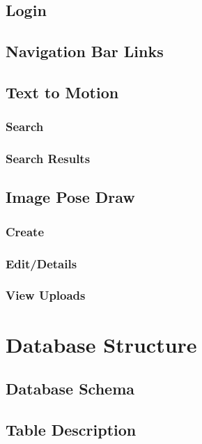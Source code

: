 \documentclass{scrreprt}
\begin{document}
\section{Login}

\section{Navigation Bar Links}

\section{Text to Motion}

\subsection{Search}

\subsection{Search Results}

\section{Image Pose Draw}

\subsection{Create}

\subsection{Edit/Details}

\subsection{View Uploads}





\chapter{Database Structure}

\section{Database Schema}
\section{Table Description}
\end{document}
